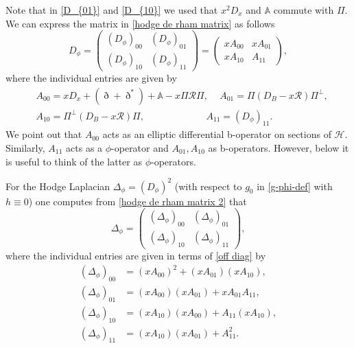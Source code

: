 Note that in \eqref{D_{01}} and \eqref{D_{10}} we used that
$x^{2}D_{x}$ and $\mathbb{A}$ commute with $\Pi$.
We can express the matrix in \eqref{hodge de rham matrix} as follows
\begin{equation}\label{hodge de rham matrix 2}
D_\phi =
\begin{pmatrix}
(D_\phi)_{00} & (D_\phi)_{01}\\
(D_\phi)_{10} & (D_\phi)_{11}
\end{pmatrix}
= \begin{pmatrix}
xA_{00} & xA_{01}\\
xA_{10} & A_{11}
\end{pmatrix},
\end{equation}
where the individual entries are given by
\begin{equation} \label{off diag}
\begin{split}
&A_{00} = xD_{x} + (\eth + \eth^{*}) + \mathbb{A} - x\Pi \mathscr{R}\Pi,\,
\quad A_{01} = \Pi\left(D_{B} - x\mathscr{R} \right)\Pi^{\bot},\\
&A_{10} = \Pi^{\bot}\left(D_{B} - x\mathscr{R}\right)\Pi, \,
\qquad \qquad \qquad \ A_{11} = (D_\phi)_{11}.
\end{split}\end{equation}
We point out that $A_{00}$ acts as an elliptic differential b-operator on sections of $\mathscr{H}$.
Similarly, $A_{11}$ acts as a $\phi$-operator and $A_{01}, A_{10}$
as b-operators. However, below it is useful to think of the latter as $\phi$-operators.

For the Hodge Laplacian $\Delta_{\phi} = (D_\phi)^{2}$
(with respect to $g_0$ in \eqref{g-phi-def} with $h\equiv 0$) one computes from \eqref{hodge de rham matrix 2}
that
\begin{equation}\label{hodge laplace matrix }
\Delta_{\phi} =
\begin{pmatrix}
(\Delta_{\phi})_{00} & (\Delta_{\phi})_{01}\\
(\Delta_{\phi})_{10} & (\Delta_{\phi})_{11}
\end{pmatrix},
\end{equation}
where the individual entries are given in terms of \eqref{off diag} by
\begin{align*}
(\Delta_{\phi})_{00} &= (xA_{00})^{2} + (xA_{01})(xA_{10}),\\
(\Delta_{\phi})_{01} &= (xA_{00})(xA_{01})+ xA_{01}A_{11},\\
(\Delta_{\phi})_{10} &= (xA_{10})(xA_{00})+ A_{11}(xA_{10}),\\
(\Delta_{\phi})_{11} &= (xA_{10})(xA_{01}) + A_{11}^2.
\end{align*}

